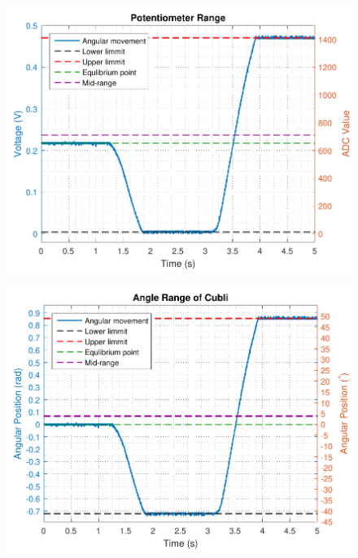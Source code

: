 \begin{minipage}{\linewidth}
  	\begin{minipage}{0.45\linewidth}
  		\begin{figure}[H]
  			\includegraphics[scale=.5]{figures/PotentiometerResolution}
  			\centering
  			\captionsetup{justification=centering}
  			\label{PotentiometerResolution}
  		\end{figure}\vspace{-5mm}
  	\end{minipage}
  	\hspace{0.03\linewidth}
  	\begin{minipage}{0.45\linewidth}
  		\begin{figure}[H]
  			\includegraphics[scale=.5]{figures/PotentiometerResolutionDegRad}

\end{figure}
\end{minipage}
\end{minipage}
